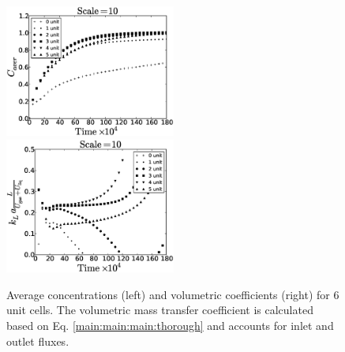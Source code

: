 \documentclass[preprint,12pt]{elsarticle}
\begin{document}
\begin{figure}[htb!]
\includegraphics[width=0.5\textwidth]{aver_units6scale10.eps}\hfill
\includegraphics[width=0.5\textwidth]{right_def_6scale10.eps}\\
\caption{Average concentrations (left) and volumetric coefficients (right) for $6$ unit cells. The
volumetric
mass transfer coefficient is calculated based on Eq. \ref{main:main:main:thorough} and accounts for inlet
and outlet fluxes. \label{fig:unit:6}}
\end{figure}
\end{document}
